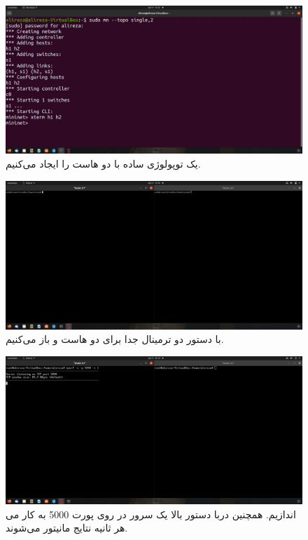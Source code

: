 \documentclass{article}
\begin{document}
\section{}
\begin{figure}[H]
    \centering
    \includegraphics[width=1.0\textwidth]{figures/2a.jpg}
    \caption
	{
یک توپولوژی ساده با دو هاست را ایجاد می‌کنیم.
	}
    \label{fig:fig1}
\end{figure}
\begin{figure}[H]
    \centering
    \includegraphics[width=1.0\textwidth]{figures/2b.jpg}
    \caption
	{
با دستور  دو ترمینال جدا برای دو هاست  و  باز می‌کنیم.
	}
    \label{fig:fig1}
\end{figure}
\begin{figure}[H]
    \centering
    \includegraphics[width=1.0\textwidth]{figures/2c.jpg}
    \caption
	{
با دستور بالا یک سرور  در  روی پورت 5000 به کار می‎‌اندازیم. همچنین در هر ثانیه نتایج مانیتور می‌شوند.
	}
    \label{fig:fig1}
\end{figure}
\end{document}

